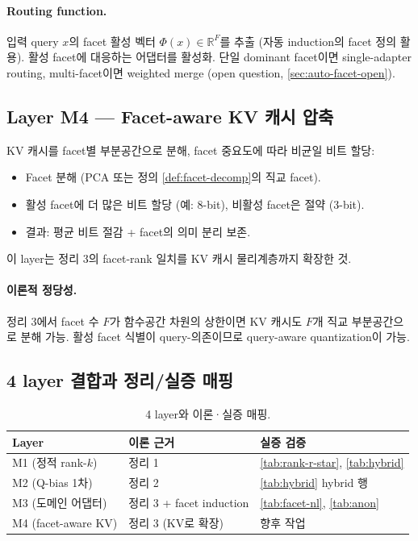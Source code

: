 \documentclass[11pt]{article}
\theoremstyle{definition}
\newcommand{\R}{\mathbb{R}}
\begin{document}
\paragraph{Routing function.}
입력 query $x$의 facet 활성 벡터 $\Phi(x) \in \R^F$를 추출 (자동 induction의 facet 정의 활용). 활성 facet에 대응하는 어댑터를 활성화. 단일 dominant facet이면 single-adapter routing, multi-facet이면 weighted merge (open question, \cref{sec:auto-facet-open}).

\subsection{Layer M4 — Facet-aware KV 캐시 압축}
\label{sec:layer-m4}

KV 캐시를 facet별 부분공간으로 분해, facet 중요도에 따라 비균일 비트 할당:
\begin{itemize}[leftmargin=*]
\item Facet 분해 (PCA 또는 정의 \ref{def:facet-decomp}의 직교 facet).
\item 활성 facet에 더 많은 비트 할당 (예: 8-bit), 비활성 facet은 절약 (3-bit).
\item 결과: 평균 비트 절감 + facet의 의미 분리 보존.
\end{itemize}
이 layer는 정리 3의 facet-rank 일치를 KV 캐시 물리계층까지 확장한 것.

\paragraph{이론적 정당성.}
정리 3에서 facet 수 $F$가 함수공간 차원의 상한이면 KV 캐시도 $F$개 직교 부분공간으로 분해 가능. 활성 facet 식별이 query-의존이므로 query-aware quantization이 가능.

\subsection{4 layer 결합과 정리/실증 매핑}

\begin{table}[h]
\centering
\caption{4 layer와 이론·실증 매핑.}
\label{tab:layer-mapping}
\small
\begin{tabular}{lp{}p{}}
\toprule
Layer & 이론 근거 & 실증 검증 \\
\midrule
M1 (정적 rank-$k$) & 정리 1 & \cref{tab:rank-r-star}, \cref{tab:hybrid} \\
M2 (Q-bias 1차) & 정리 2 & \cref{tab:hybrid} hybrid 행 \\
M3 (도메인 어댑터) & 정리 3 + facet induction & \cref{tab:facet-nl}, \cref{tab:anon} \\
M4 (facet-aware KV) & 정리 3 (KV로 확장) & 향후 작업 \\
\bottomrule
\end{tabular}
\end{table}
\end{document}
